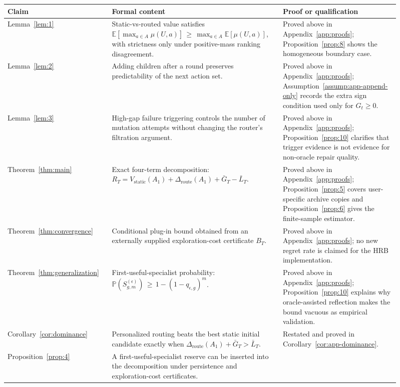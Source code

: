 \documentclass{article} %
\begin{document}
\begin{table}[h]
\centering
\small
\begin{tabular}{p{0.24\linewidth}p{0.39\linewidth}p{0.28\linewidth}}
\toprule
Claim & Formal content & Proof or qualification \\
\midrule
Lemma~\ref{lem:1} &
Static-vs-routed value satisfies
\(\mathbb{E}[\max_{a\in A}\mu(U,a)]\,\ge\, \max_{a\in A}\mathbb{E}[\mu(U,a)]\), with strictness only under positive-mass ranking disagreement. &
Proved above in Appendix~\ref{app:proofs}; Proposition~\ref{prop:8} shows the homogeneous boundary case. \\
\midrule
Lemma~\ref{lem:2} &
Adding children after a round preserves predictability of the next action set. &
Proved above in Appendix~\ref{app:proofs}; Assumption~\ref{assump:app-append-only} records the extra sign condition used only for \(G_t\ge 0\). \\
\midrule
Lemma~\ref{lem:3} &
High-gap failure triggering controls the number of mutation attempts without changing the router's filtration argument. &
Proved above in Appendix~\ref{app:proofs}; Proposition~\ref{prop:10} clarifies that trigger evidence is not evidence for non-oracle repair quality. \\
\midrule
Theorem~\ref{thm:main} &
Exact four-term decomposition:
\(R_T=V_{\mathrm{static}}(A_1)+\Delta_{\mathrm{route}}(A_1)+\bar G_T-\bar L_T\). &
Proved above in Appendix~\ref{app:proofs}; Proposition~\ref{prop:5} covers user-specific archive copies and Proposition~\ref{prop:6} gives the finite-sample estimator. \\
\midrule
Theorem~\ref{thm:convergence} &
Conditional plug-in bound obtained from an externally supplied exploration-cost certificate \(B_T\). &
Proved above in Appendix~\ref{app:proofs}; no new regret rate is claimed for the HRB implementation. \\
\midrule
Theorem~\ref{thm:generalization} &
First-useful-specialist probability:
\(\mathbb{P}(S_{g,m}^{(\epsilon)})\,\ge\, 1-(1-q_{\epsilon,g})^m\). &
Proved above in Appendix~\ref{app:proofs}; Proposition~\ref{prop:10} explains why oracle-assisted reflection makes the bound vacuous as empirical validation. \\
\midrule
Corollary~\ref{cor:dominance} &
Personalized routing beats the best static initial candidate exactly when
\(\Delta_{\mathrm{route}}(A_1)+\bar G_T>\bar L_T\). &
Restated and proved in Corollary~\ref{cor:app-dominance}. \\
\midrule
Proposition~\ref{prop:4} &
A first-useful-specialist reserve can be inserted into the decomposition under persistence and exploration-cost certificates. &

\end{tabular}
\end{table}
\end{document}
